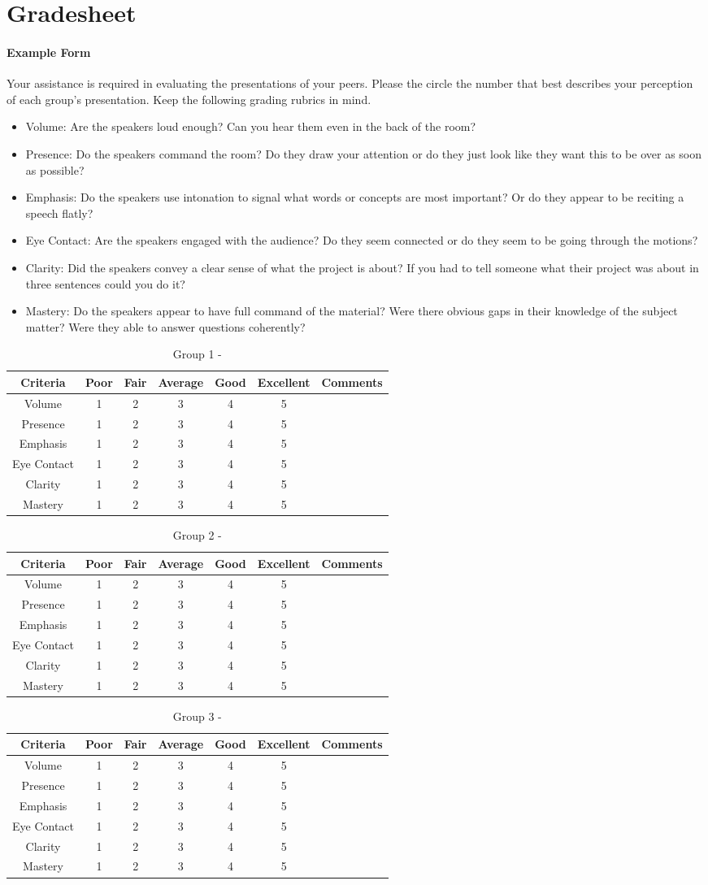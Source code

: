 \documentclass[10pt]{article}
\begin{document}

\newcommand{\grademe}[2]{
\begin{table}[h!]
	\centering
	\begin{tabular}{|c|c|c|c|c|c|p{2.5in}|}
	\hline
	Criteria & Poor & Fair & Average & Good & Excellent & Comments \\
	\hline
	Volume 		& 1 & 2 & 3 & 4 & 5 & \\
	Presence 	& 1 & 2 & 3 & 4 & 5 & \\
	Emphasis 	& 1 & 2 & 3 & 4 & 5 & \\
	Eye Contact & 1 & 2 & 3 & 4 & 5 & \\
	Clarity 	& 1 & 2 & 3 & 4 & 5 & \\
	Mastery		& 1 & 2 & 3 & 4 & 5 & \\
	\hline
	\end{tabular}
	\caption{Group #1 - #2}
\end{table}
}

\section*{Gradesheet}

\paragraph{Example Form}

Your assistance is required in evaluating the presentations of your peers. Please the circle the number that best describes your perception of each group's presentation. Keep the following grading rubrics in mind. 

\begin{itemize}
	\item Volume: Are the speakers loud enough? Can you hear them even in the back of the room? 
	\item Presence: Do the speakers command the room? Do they draw your attention or do they just look like they want this to be over as soon as possible?
	\item Emphasis: Do the speakers use intonation to signal what words or concepts are most important? Or do they appear to be reciting a speech flatly?
	\item Eye Contact: Are the speakers engaged with the audience? Do they seem connected or do they seem to be going through the motions?	
	\item Clarity: Did the speakers convey a clear sense of what the project is about? If you had to tell someone what their project was about in three sentences could you do it? 
	\item Mastery: Do the speakers appear to have full command of the material? Were there obvious gaps in their knowledge of the subject matter? Were they able to answer questions coherently? 	
\end{itemize}

\grademe{1}{}
\grademe{2}{}
\grademe{3}{}
\end{document}
